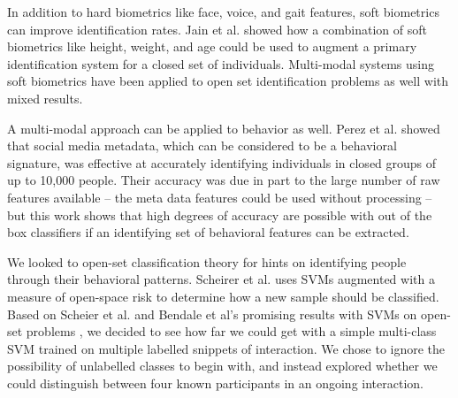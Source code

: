 \documentclass[conference]{IEEEtran}
\begin{document}
In addition to hard biometrics like face, voice, and gait features, soft biometrics can improve identification rates. Jain et al. \cite{jain2004soft} showed how a combination of soft biometrics like height, weight, and age could be used to augment a primary identification system for a closed set of individuals. Multi-modal systems using soft biometrics have been applied to open set identification problems as well with mixed results. \cite{irfan2018multi}\cite{martinson2013identifying}  

A multi-modal approach can be applied to behavior as well. Perez et al. showed that social media metadata, which can be considered to be a behavioral signature, was effective at accurately identifying individuals in closed groups of up to 10,000 people. Their accuracy was due in part to the large number of raw features available -- the meta data features could be used without processing -- but this work shows that high degrees of accuracy are possible with out of the box classifiers if an identifying set of behavioral features can be extracted. 

We looked to open-set classification theory for hints on identifying people through their behavioral patterns. Scheirer et al. uses SVMs augmented with a measure of open-space risk to determine how a new sample should be classified\cite{scheirer_toward_2013}. Based on Scheier et al. and Bendale et al's promising results with SVMs on open-set problems \cite{bendale_towards_2015}\cite{scheirer_toward_2013}, we decided to see how far we could get with a simple multi-class SVM trained on multiple labelled snippets of interaction. We chose to ignore the possibility of unlabelled classes to begin with, and instead explored whether we could distinguish between four known participants in an ongoing interaction. 
\end{document}
